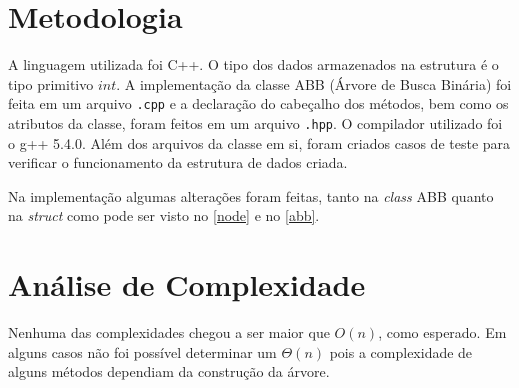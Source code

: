 \section{Metodologia}

A linguagem utilizada foi C++. O tipo dos dados armazenados na estrutura é 
o tipo primitivo $ int $. A implementação da classe ABB (Árvore de Busca 
Binária) foi feita em um arquivo \texttt{.cpp} e a declaração do cabeçalho
dos métodos, bem como os atributos da classe, foram feitos em um arquivo
\texttt{.hpp}. O compilador utilizado foi o g++ 5.4.0. Além dos arquivos da
classe em si, foram criados casos de teste para verificar o funcionamento da
estrutura de dados criada.

Na implementação algumas alterações foram feitas, tanto na \emph{class} ABB
quanto na \emph{struct} como pode ser visto no \autoref{node} e no 
\autoref{abb}.

\section{Análise de Complexidade}

Nenhuma das complexidades chegou a ser maior que $ O(n) $, como esperado.
Em alguns casos não foi possível determinar um $ \Theta (n) $ pois a 
complexidade de alguns métodos dependiam da construção da árvore. 


